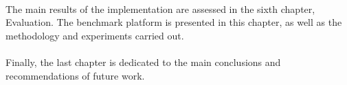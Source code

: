 \paragraph{}

The main results of the implementation are assessed in the sixth chapter, Evaluation.
The benchmark platform is presented in this chapter, as well as the methodology and experiments carried out.

\paragraph{}

Finally, the last chapter is dedicated to the main conclusions and recommendations of future
work.

